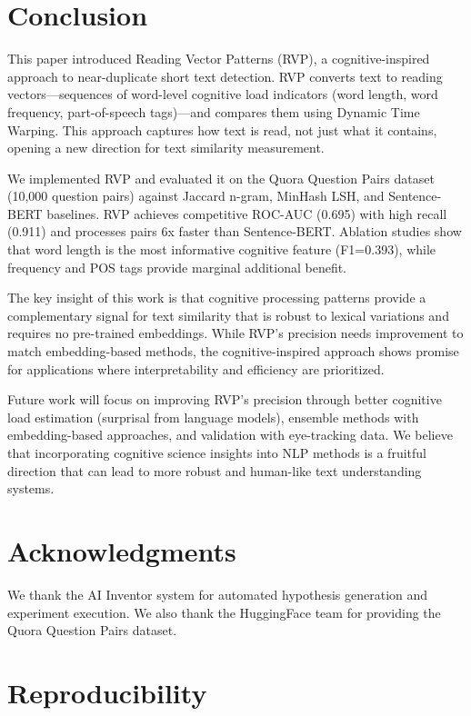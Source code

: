 \documentclass[11pt,letterpaper]{article}
\begin{document}
\section{Conclusion}

This paper introduced Reading Vector Patterns (RVP), a cognitive-inspired approach to near-duplicate short text detection. RVP converts text to reading vectors---sequences of word-level cognitive load indicators (word length, word frequency, part-of-speech tags)---and compares them using Dynamic Time Warping. This approach captures how text is read, not just what it contains, opening a new direction for text similarity measurement.

We implemented RVP and evaluated it on the Quora Question Pairs dataset (10,000 question pairs) against Jaccard n-gram, MinHash LSH, and Sentence-BERT baselines. RVP achieves competitive ROC-AUC (0.695) with high recall (0.911) and processes pairs 6x faster than Sentence-BERT. Ablation studies show that word length is the most informative cognitive feature (F1=0.393), while frequency and POS tags provide marginal additional benefit.

The key insight of this work is that cognitive processing patterns provide a complementary signal for text similarity that is robust to lexical variations and requires no pre-trained embeddings. While RVP's precision needs improvement to match embedding-based methods, the cognitive-inspired approach shows promise for applications where interpretability and efficiency are prioritized.

Future work will focus on improving RVP's precision through better cognitive load estimation (surprisal from language models), ensemble methods with embedding-based approaches, and validation with eye-tracking data. We believe that incorporating cognitive science insights into NLP methods is a fruitful direction that can lead to more robust and human-like text understanding systems.

\section*{Acknowledgments}

We thank the AI Inventor system for automated hypothesis generation and experiment execution. We also thank the HuggingFace team for providing the Quora Question Pairs dataset.




\appendix
\section{Reproducibility}
\end{document}
